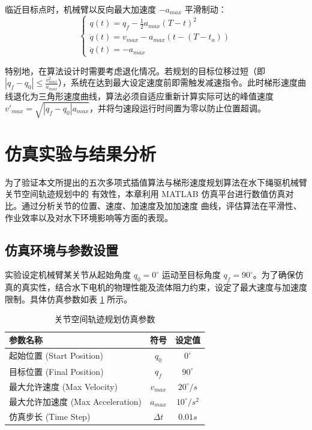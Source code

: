 临近目标点时，机械臂以反向最大加速度 $-a_{max}$ 平滑制动：
\begin{equation}
    \begin{cases}
        q(t) = q_f - \frac{1}{2} a_{max} (T - t)^2 \\
        \dot{q}(t) = v_{max} - a_{max}(t - (T - t_a)) \\
        \ddot{q}(t) = -a_{max}
    \end{cases}
\end{equation}

特别地，在算法设计时需要考虑退化情况。若规划的目标位移过短（即 $|q_f - q_0| \le \frac{v_{max}^2}{a_{max}}$），系统在达到最大设定速度前即需触发减速指令。此时梯形速度曲线退化为三角形速度曲线，算法必须自适应重新计算实际可达的峰值速度 $v'_{max} = \sqrt{|q_f - q_0| a_{max}}$，并将匀速段运行时间置为零以防止位置超调。



\section{仿真实验与结果分析}

为了验证本文所提出的五次多项式插值算法与梯形速度规划算法在水下绳驱机械臂关节空间轨迹规划中的
有效性，本章利用 MATLAB 仿真平台进行数值仿真对比。通过分析关节的位置、速度、加速度及加加速度
曲线，评估算法在平滑性、作业效率以及对水下环境影响等方面的表现。

\subsection{仿真环境与参数设置}

实验设定机械臂某关节从起始角度 $q_0 = 0^\circ$ 运动至目标角度 $q_f = 90^\circ$。为了确保仿真的真实性，结合水下电机的物理性能及流体阻力约束，设定了最大速度与加速度限制。具体仿真参数如表 \ref{tab:params} 所示。

\begin{table}[htbp]
\centering
\caption{关节空间轨迹规划仿真参数}
\label{tab:params}
\begin{tabular}{lcc}
\hline
\textbf{参数名称} & \textbf{符号} & \textbf{设定值} \\ \hline
起始位置 (Start Position) & $q_0$ & $0^\circ$ \\
目标位置 (Final Position) & $q_f$ & $90^\circ$ \\
最大允许速度 (Max Velocity) & $v_{max}$ & $20^\circ/s$ \\
最大允许加速度 (Max Acceleration) & $a_{max}$ & $10^\circ/s^2$ \\
仿真步长 (Time Step) & $\Delta t$ & $0.01s$ \\
\hline
\end{tabular}
\end{table}

